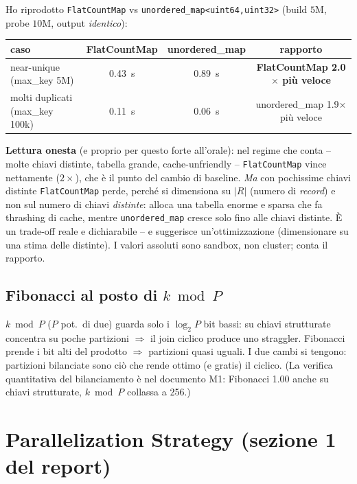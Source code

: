 \documentclass[11pt,a4paper]{article}
\begin{document}
\begin{misura}
Ho riprodotto \texttt{FlatCountMap} vs \texttt{unordered\_map<uint64,uint32>} (build $5$M, probe $10$M, output \emph{identico}):
\begin{center}\small
\begin{tabular}{@{}lccc@{}}\toprule
caso & FlatCountMap & unordered\_map & rapporto \\\midrule
near-unique (max\_key 5M) & 0.43~s & 0.89~s & \textbf{FlatCountMap 2.0$\times$ più veloce} \\
molti duplicati (max\_key 100k) & 0.11~s & 0.06~s & unordered\_map 1.9$\times$ più veloce \\\bottomrule
\end{tabular}
\end{center}
\textbf{Lettura onesta} (e proprio per questo forte all'orale): nel regime che conta -- molte chiavi distinte, tabella grande, cache-unfriendly -- \texttt{FlatCountMap} vince nettamente ($2\times$), che è il punto del cambio di baseline. \emph{Ma} con pochissime chiavi distinte \texttt{FlatCountMap} perde, perché si dimensiona su $|R|$ (numero di \emph{record}) e non sul numero di chiavi \emph{distinte}: alloca una tabella enorme e sparsa che fa thrashing di cache, mentre \texttt{unordered\_map} cresce solo fino alle chiavi distinte. È un trade-off reale e dichiarabile -- e suggerisce un'ottimizzazione (dimensionare su una stima delle distinte). I valori assoluti sono sandbox, non cluster; conta il rapporto.
\end{misura}

\subsection{Fibonacci al posto di $k\bmod P$}

\begin{motiv}
$k\bmod P$ ($P$ pot.\ di due) guarda solo i $\log_2 P$ bit bassi: su chiavi strutturate concentra su poche partizioni $\Rightarrow$ il join ciclico produce uno straggler. Fibonacci prende i bit alti del prodotto $\Rightarrow$ partizioni quasi uguali. I due cambi si tengono: partizioni bilanciate sono ciò che rende ottimo (e gratis) il ciclico. (La verifica quantitativa del bilanciamento è nel documento M1: Fibonacci 1.00 anche su chiavi strutturate, $k\bmod P$ collassa a 256.)
\end{motiv}

\section{Parallelization Strategy (sezione 1 del report)}
\end{document}
